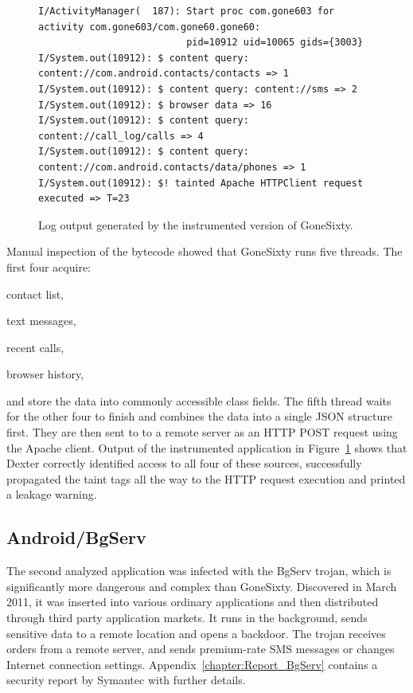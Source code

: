 \documentclass[12pt,twoside,notitlepage]{report}
\begin{document}
\begin{figure}[t]
	\scriptsize
	\begin{verbatim}
I/ActivityManager(  187): Start proc com.gone603 for activity com.gone603/com.gone60.gone60: 
                          pid=10912 uid=10065 gids={3003}
I/System.out(10912): $ content query: content://com.android.contacts/contacts => 1
I/System.out(10912): $ content query: content://sms => 2
I/System.out(10912): $ browser data => 16
I/System.out(10912): $ content query: content://call_log/calls => 4
I/System.out(10912): $ content query: content://com.android.contacts/data/phones => 1
I/System.out(10912): $! tainted Apache HTTPClient request executed => T=23
	\end{verbatim}
	\caption{Log output generated by the instrumented version of GoneSixty.}
	\label{figure:Evaluation_GoneSixty}
\end{figure}

Manual inspection of the bytecode showed that GoneSixty runs five threads. The first four acquire:
\begin{inparaenum}[(i)]
\item contact list,
\item text messages,
\item recent calls,
\item browser history,
\end{inparaenum}
and store the data into commonly accessible class fields. The fifth thread waits for the other four to finish and combines the data into a single JSON structure first. They are then sent to to a remote server as an HTTP POST request using the Apache client. Output of the instrumented application in Figure~\ref{figure:Evaluation_GoneSixty} shows that Dexter correctly identified access to all four of these sources, successfully propagated the taint tags all the way to the HTTP request execution and printed a leakage warning. 

\subsection{Android/BgServ}

The second analyzed application was infected with the BgServ trojan, which is significantly more dangerous and complex than GoneSixty. Discovered in March 2011, it was inserted into various ordinary applications and then distributed through third party application markets. It runs in the background, sends sensitive data to a remote location and opens a backdoor. The trojan receives orders from a remote server, and sends premium-rate SMS messages or changes Internet connection settings. Appendix~\ref{chapter:Report_BgServ} contains a security report by Symantec with further details. 
\end{document}
